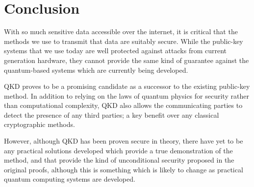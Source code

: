 \documentclass[runningheads,a4paper]{llncs}
\begin{document}
\section{Conclusion}

With so much sensitive data accessible over the internet, it is critical that the methods we use to transmit that data are suitably secure. While the public-key systems that we use today are well protected against attacks from current generation hardware, they cannot provide the same kind of guarantee against the quantum-based systems which are currently being developed.

QKD proves to be a promising candidate as a successor to the existing public-key method. In addition to relying on the laws of quantum physics for security rather than computational complexity, QKD also allows the communicating parties to detect the presence of any third parties; a key benefit over any classical cryptographic methods.

However, although QKD has been proven secure in theory, there have yet to be any practical solutions developed which provide a true demonstration of the method, and that provide the kind of unconditional security proposed in the original proofs, although this is something which is likely to change as practical quantum computing systems are developed.



\end{document}
